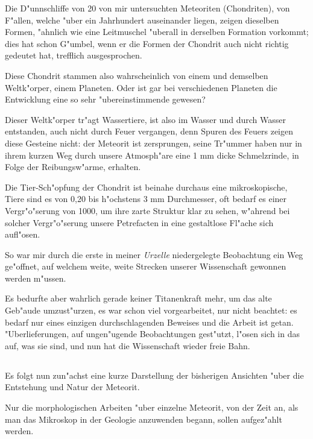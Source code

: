 \documentclass[a4paper, 11pt, oneside]{article}
\begin{document}
Die D"unnschliffe von 20 von mir untersuchten Meteoriten (Chondriten), von F"allen, welche "uber ein Jahrhundert auseinander liegen, zeigen dieselben Formen, "ahnlich wie eine Leitmuschel "uberall in derselben Formation vorkommt; dies hat schon G"umbel, wenn er die Formen der Chondrit auch nicht richtig gedeutet hat, trefflich ausgesprochen.

Diese Chondrit stammen also wahrscheinlich von einem und demselben Weltk"orper, einem Planeten. Oder ist gar bei verschiedenen Planeten die Entwicklung eine so sehr "ubereinstimmende gewesen?

Dieser Weltk"orper tr"agt Wassertiere, ist also im Wasser und durch Wasser entstanden, auch nicht durch Feuer vergangen, denn Spuren des Feuers zeigen diese Gesteine nicht: der Meteorit ist zersprungen, seine Tr"ummer haben nur in ihrem kurzen Weg durch unsere Atmosph"are eine 1 mm dicke Schmelzrinde, in Folge der Reibungsw"arme, erhalten.

Die Tier-Sch"opfung der Chondrit ist beinahe durchaus eine mikroskopische, Tiere sind es von 0,20 bis h"ochstens 3 mm Durchmesser, oft bedarf es einer Vergr"o"serung von 1000, um ihre zarte Struktur klar zu sehen, w"ahrend bei solcher Vergr"o"serung unsere Petrefacten in eine gestaltlose Fl"ache sich aufl"osen.

So war mir durch die erste in meiner \emph{Urzelle} niedergelegte Beobachtung ein Weg ge"offnet, auf welchem weite, weite Strecken unserer Wissenschaft gewonnen werden m"ussen.

Es bedurfte aber wahrlich gerade keiner Titanenkraft mehr, um das alte Geb"aude umzust"urzen, es war schon viel vorgearbeitet, nur nicht beachtet: es bedarf nur eines einzigen durchschlagenden Beweises und die Arbeit ist getan. "Uberlieferungen, auf ungen"ugende Beobachtungen gest"utzt, l"osen sich in das auf, was sie sind, und nun hat die Wissenschaft wieder freie Bahn.
\clearpage
\subsection{}
\paragraph{}
Es folgt nun zun"achst eine kurze Darstellung der bisherigen Ansichten "uber die Entstehung und Natur der Meteorit.

Nur die morphologischen Arbeiten "uber einzelne Meteorit, von der Zeit an, als man das Mikroskop in der Geologie anzuwenden begann, sollen aufgez"ahlt werden.
\end{document}

